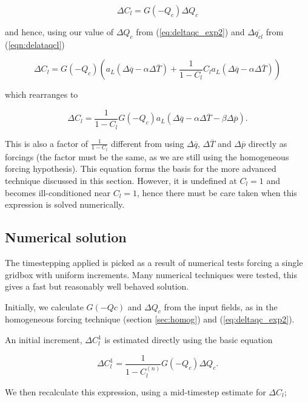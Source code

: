 \documentclass{UMDP_article}
\begin{document}
\begin{equation}
\Delta C_l = G(-Q_c) \Delta Q_c
\end{equation}

and hence, using our value of $\Delta Q_c$ from (\ref{eq:deltaqc_exp2})
and $\Delta \overline{q_{cl}}$ from (\ref{eqn:delataqcl})

\begin{equation}
\Delta C_l = G(-Q_c) (a_L ( \Delta \overline{q} - \alpha \Delta \overline{T} )
+ \frac{1}{1-C_l} C_l a_L ( \Delta \overline{q} - \alpha \Delta \overline{T} ) )
\end{equation}

which rearranges to

\begin{equation}
\Delta C_l = \frac{1}{1-C_l} G(-Q_c) a_L ( \Delta \overline{q}
- \alpha \Delta \overline{T} -\beta \Delta \overline{p}) .
\label{eqn:c1mc}
\end{equation}

This is also a factor of $\frac{1}{1-C_l}$ different from using
$\Delta \overline{q}$,
$\Delta \overline{T}$ and $\Delta \overline{p}$
directly as forcings (the factor must be the same, as we are still
using the homogeneous forcing hypothesis). This equation forms the basis
for the more advanced technique discussed in this section. However,
it is undefined at $C_l=1$ and becomes ill-conditioned near $C_l=1$,
hence there must be care taken when this expression is solved numerically.

\subsection{Numerical solution}

The timestepping applied is picked as a result of numerical tests
forcing a single gridbox with uniform increments. Many numerical techniques
were tested, this gives a fast but reasonably well behaved solution.

Initially, we calculate $G(-Qc)$ and $\Delta Q_c$ from the input fields,
as in the homogeneous forcing
technique (section \ref{sec:homog}) and (\ref{eq:deltaqc_exp2}).

An initial increment, $\Delta C_l^1$ is estimated directly using the
basic equation

\begin{equation}
\Delta C_l^1 = \frac{1}{1-C_l^(n)} G(-Q_c) \Delta Q_c .
\end{equation}

We then recalculate this expression, using a mid-timestep estimate
for $\Delta C_l$;
\end{document}
